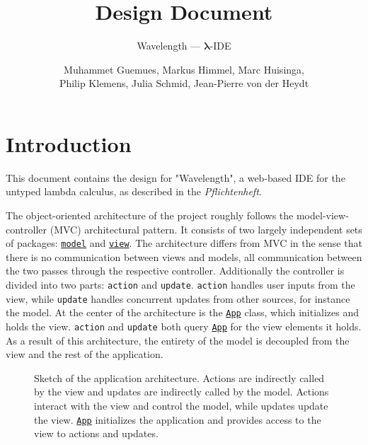 \documentclass[a4paper, parskip=half]{scrartcl}
\title{Design Document}
\subtitle{Wavelength --- $\bm{\lambda}$-IDE}
\author{Muhammet Guemues, Markus Himmel, Marc Huisinga,\\Philip Klemens, Julia Schmid, Jean-Pierre von der Heydt}
\newcommand{\pkglnk}[1]{\hyperref[pkg:edu.kit.wavelength.client.#1]{#1}}
\begin{document}
\maketitle
\thispagestyle{empty}
\newpage
\tableofcontents
\newpage
\section{Introduction}

This document contains the design for "Wavelength", a web-based IDE for the untyped
lambda calculus, as described in the \textit{Pflichtenheft}.

The object-oriented architecture of the project roughly follows the model-view-controller (MVC)
architectural pattern. It consists of two largely independent sets of packages: \texttt{\pkglnk{model}} and \texttt{\pkglnk{view}}.
The architecture differs from MVC in the sense that there is no communication between views and models, 
all communication between the two passes through the respective controller. 
Additionally the controller is divided into two parts: \texttt{action} and \texttt{update}. 
\texttt{action} handles user inputs from the view, while \texttt{update} handles concurrent updates from other sources, for instance the model.
At the center of the architecture is the \texttt{\hyperref[type:edu.kit.wavelength.client.view.App]{App}} class, which initializes and holds the view. 
\texttt{action} and \texttt{update} both query \texttt{\hyperref[type:edu.kit.wavelength.client.view.App]{App}} for the view elements it holds.
As a result of this architecture, the entirety of the model is decoupled from the view and the rest of the application.

\begin{figure}[h]
	\centering
	\caption{Sketch of the application architecture. Actions are indirectly called by the view
	and updates are indirectly called by the model. Actions interact with the view and control the model,
	while updates update the view. \texttt{\hyperref[type:edu.kit.wavelength.client.view.App]{App}} initializes 
	the application and provides access to the view to
		actions and updates.}
\end{figure}
\end{document}
